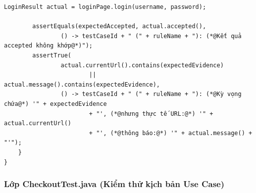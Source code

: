 \documentclass[a4paper]{article}
\begin{document}
\begin{lstlisting}[caption={Trích đoạn mã nguồn lớp LoginTest.java}]
        LoginResult actual = loginPage.login(username, password);

        assertEquals(expectedAccepted, actual.accepted(),
                () -> testCaseId + " (" + ruleName + "): (*@Kết quả accepted không khớp@*)");
        assertTrue(
                actual.currentUrl().contains(expectedEvidence)
                        || actual.message().contains(expectedEvidence),
                () -> testCaseId + " (" + ruleName + "): (*@Kỳ vọng chứa@*) '" + expectedEvidence
                        + "', (*@nhưng thực tế URL:@*) '" + actual.currentUrl()
                        + "', (*@thông báo:@*) '" + actual.message() + "'");
    }
}
\end{lstlisting}

\subsubsection{Lớp CheckoutTest.java (Kiểm thử kịch bản Use Case)}
\end{document}
